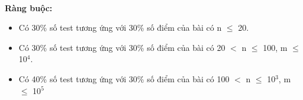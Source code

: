  

\textbf{Ràng buộc:}
\begin{itemize}
	\item Có 30\% số test tương ứng với 30\% số điểm của bài có n  $\le$  20.
	\item Có 30\% số test tương ứng với 30\% số điểm của bài có 20 $<$ n  $\le$  100, m  $\le$  10$^4$.
	\item Có 40\% số test tương ứng với 30\% số điểm của bài có 100 $<$ n  $\le$  10$^3$, m  $\le$  10$^5$
\end{itemize}
\begin{itemize}
\end{itemize}
